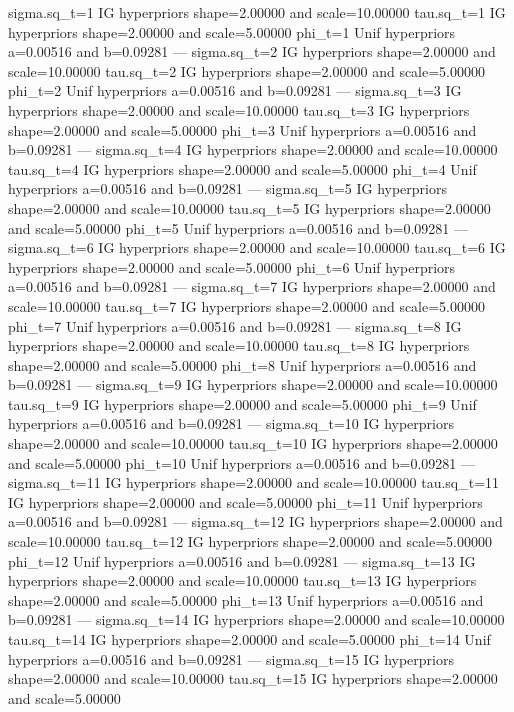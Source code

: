 \documentclass{article}
\begin{document}
\begin{Schunk}
\begin{Soutput}
	sigma.sq_t=1 IG hyperpriors shape=2.00000 and scale=10.00000
	tau.sq_t=1 IG hyperpriors shape=2.00000 and scale=5.00000
	phi_t=1 Unif hyperpriors a=0.00516 and b=0.09281
	---
	sigma.sq_t=2 IG hyperpriors shape=2.00000 and scale=10.00000
	tau.sq_t=2 IG hyperpriors shape=2.00000 and scale=5.00000
	phi_t=2 Unif hyperpriors a=0.00516 and b=0.09281
	---
	sigma.sq_t=3 IG hyperpriors shape=2.00000 and scale=10.00000
	tau.sq_t=3 IG hyperpriors shape=2.00000 and scale=5.00000
	phi_t=3 Unif hyperpriors a=0.00516 and b=0.09281
	---
	sigma.sq_t=4 IG hyperpriors shape=2.00000 and scale=10.00000
	tau.sq_t=4 IG hyperpriors shape=2.00000 and scale=5.00000
	phi_t=4 Unif hyperpriors a=0.00516 and b=0.09281
	---
	sigma.sq_t=5 IG hyperpriors shape=2.00000 and scale=10.00000
	tau.sq_t=5 IG hyperpriors shape=2.00000 and scale=5.00000
	phi_t=5 Unif hyperpriors a=0.00516 and b=0.09281
	---
	sigma.sq_t=6 IG hyperpriors shape=2.00000 and scale=10.00000
	tau.sq_t=6 IG hyperpriors shape=2.00000 and scale=5.00000
	phi_t=6 Unif hyperpriors a=0.00516 and b=0.09281
	---
	sigma.sq_t=7 IG hyperpriors shape=2.00000 and scale=10.00000
	tau.sq_t=7 IG hyperpriors shape=2.00000 and scale=5.00000
	phi_t=7 Unif hyperpriors a=0.00516 and b=0.09281
	---
	sigma.sq_t=8 IG hyperpriors shape=2.00000 and scale=10.00000
	tau.sq_t=8 IG hyperpriors shape=2.00000 and scale=5.00000
	phi_t=8 Unif hyperpriors a=0.00516 and b=0.09281
	---
	sigma.sq_t=9 IG hyperpriors shape=2.00000 and scale=10.00000
	tau.sq_t=9 IG hyperpriors shape=2.00000 and scale=5.00000
	phi_t=9 Unif hyperpriors a=0.00516 and b=0.09281
	---
	sigma.sq_t=10 IG hyperpriors shape=2.00000 and scale=10.00000
	tau.sq_t=10 IG hyperpriors shape=2.00000 and scale=5.00000
	phi_t=10 Unif hyperpriors a=0.00516 and b=0.09281
	---
	sigma.sq_t=11 IG hyperpriors shape=2.00000 and scale=10.00000
	tau.sq_t=11 IG hyperpriors shape=2.00000 and scale=5.00000
	phi_t=11 Unif hyperpriors a=0.00516 and b=0.09281
	---
	sigma.sq_t=12 IG hyperpriors shape=2.00000 and scale=10.00000
	tau.sq_t=12 IG hyperpriors shape=2.00000 and scale=5.00000
	phi_t=12 Unif hyperpriors a=0.00516 and b=0.09281
	---
	sigma.sq_t=13 IG hyperpriors shape=2.00000 and scale=10.00000
	tau.sq_t=13 IG hyperpriors shape=2.00000 and scale=5.00000
	phi_t=13 Unif hyperpriors a=0.00516 and b=0.09281
	---
	sigma.sq_t=14 IG hyperpriors shape=2.00000 and scale=10.00000
	tau.sq_t=14 IG hyperpriors shape=2.00000 and scale=5.00000
	phi_t=14 Unif hyperpriors a=0.00516 and b=0.09281
	---
	sigma.sq_t=15 IG hyperpriors shape=2.00000 and scale=10.00000
	tau.sq_t=15 IG hyperpriors shape=2.00000 and scale=5.00000

\end{Soutput}
\end{Schunk}
\end{document}
